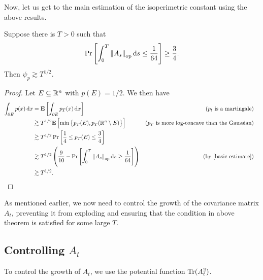 \documentclass{article}
\begin{document}
		Now, let us get to the main estimation of the isoperimetric constant using the above results.

		\begin{ftheo}
			\label{lee-vem: isoperimetric using time}
			Suppose there is $T > 0$ such that
			\[ \Pr\left[\int_0^T \left\lVert A_s\right\rVert_{\text{op}} \operatorname{d}\!{s} \leq \frac{1}{64} \right] \geq \frac{3}{4}. \]
			Then $\psi_p \gtrsim T^{1/2}$.
		\end{ftheo}
		\begin{proof}
			Let $E\subseteq\mathbb{R}^n$ with $p(E) = 1/2$.
			We then have
			\begin{align*}
				\int_{\partial E} p(x) \d{x} &= \expec\left[ \int_{\partial E} p_T(x)\d{x} \right] & (p_t\text{ is a martingale}) \\
					&\gtrsim T^{1/2} \expec \left[ \min\left\{p_T(E) , p_T(\Rn\setminus E)\right\} \right] & \text{($p_T$ is more log-concave than the Gaussian)} \\
					&\gtrsim T^{1/2} \Pr\left[ \frac{1}{4} \leq p_T(E) \leq \frac{3}{4} \right] \\
					&\gtrsim T^{1/2} \left(\frac{9}{10} - \Pr\left[\int_0^T \opnorm{A_s}\d{s} \geq \frac{1}{64}\right]\right) & \text{(by \Cref{basic estimate})} \\
					&\gtrsim T^{1/2}. & & \qedhere
			\end{align*}
		\end{proof}

		As mentioned earlier, we now need to control the growth of the covariance matrix $A_t$, preventing it from exploding and ensuring that the condition in above theorem is satisfied for some large $T$.

	\subsection{Controlling \texorpdfstring{$A_t$}{At}}

		To control the growth of $A_t$, we use the potential function $\operatorname{Tr}(A_t^2)$.
\end{document}
